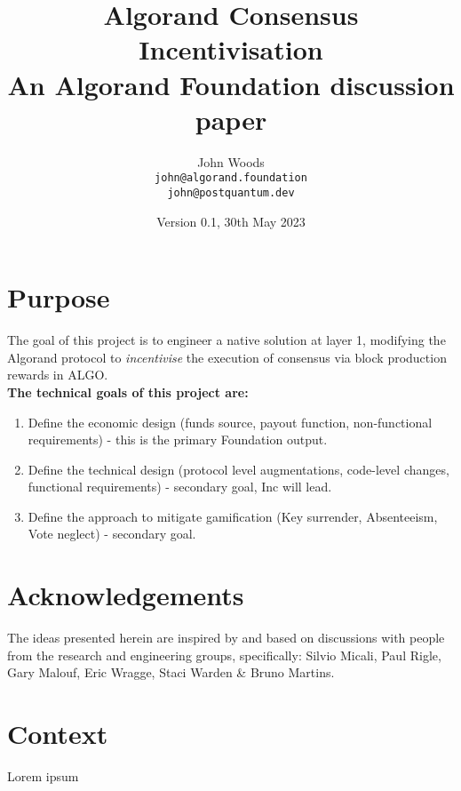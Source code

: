 \documentclass[11pt,a4paper]{article}
\begin{document}
\title {Algorand Consensus Incentivisation \\
       {\large \sc An Algorand Foundation discussion paper}}
\date  {Version 0.1, 30th May 2023}
\author{John Woods         \\ {\small \texttt{john@algorand.foundation}} \\
                              {\small \texttt{john@postquantum.dev}} \\
}

\maketitle

\section{Purpose}
The goal of this project is to engineer a native solution at layer 1, modifying the Algorand protocol to \emph{incentivise} the execution of consensus via block production rewards in ALGO. \\

\textbf{The technical goals of this project are:}

\begin{enumerate}
    \item Define the economic design (funds source, payout function, non-functional requirements) - this is the primary Foundation output.
    \item Define the technical design (protocol level augmentations, code-level changes, functional requirements) - secondary goal, Inc will lead.
    \item Define the approach to mitigate gamification (Key surrender, Absenteeism, Vote neglect) - secondary goal.
\end{enumerate}

\pagebreak

\tableofcontents

\pagebreak

\section{Acknowledgements}
The ideas presented herein are inspired by and based on discussions with
people from the research and engineering groups, specifically: Silvio Micali, Paul Rigle, Gary Malouf, Eric Wragge, Staci Warden \& Bruno Martins.

\pagebreak

\section{Context}
Lorem ipsum
\end{document}
